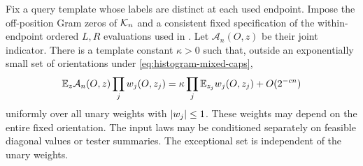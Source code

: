 \begin{lemma}\label{lem:binary-mixing}
Fix a query template whose labels are distinct at each used endpoint.
Impose the off-position Gram zeros of $\mathcal K_n$ and a consistent fixed
specification of the within-endpoint ordered $L,R$ evaluations used
in . Let $\mathcal A_n(O,z)$ be their joint
indicator. There is a template constant $\kappa>0$ such that, outside
an exponentially small set of orientations under
\eqref{eq:histogram-mixed-caps},
\begin{equation}\label{eq:binary-mixing}
 \mathbb E_z\mathcal A_n(O,z)\prod_jw_j(O,z_j)
 =\kappa\prod_j\mathbb E_{z_j}w_j(O,z_j)+O(2^{-c n})
\end{equation}
uniformly over all unary weights with $\lvert w_j\rvert\le1$. These weights
may depend on the entire fixed orientation. The input laws may be
conditioned separately on feasible diagonal values or tester summaries.
The exceptional set is independent of the unary weights.
\end{lemma}

